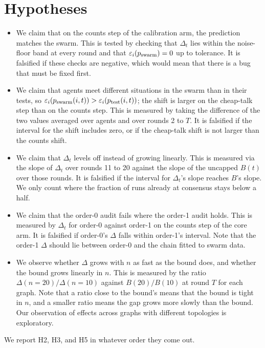 \section{Hypotheses}

\begin{itemize}
  \item[H1] We claim that on the counts step of the calibration arm, the prediction matches the swarm. This is tested by checking that $\Delta_t$ lies within the noise-floor band at every round and that $\varepsilon_i(p_{\mathrm{swarm}}) = 0$ up to tolerance. It is falsified if these checks are negative, which would mean that there is a bug that must be fixed first.
  \item[H2] We claim that agents meet different situations in the swarm than in their tests, so $\varepsilon_i(p_{\mathrm{swarm}}(i, t)) > \varepsilon_i(p_{\mathrm{test}}(i, t))$; the shift is larger on the cheap-talk step than on the counts step. This is measured by taking the difference of the two values averaged over agents and over rounds 2 to $T$. It is falsified if the interval for the shift includes zero, or if the cheap-talk shift is not larger than the counts shift.
  \item[H3] We claim that $\Delta_t$ levels off instead of growing linearly. This is measured via the slope of $\Delta_t$ over rounds 11 to 20 against the slope of the uncapped $B(t)$ over those rounds. It is falsified if the interval for $\Delta_t$'s slope reaches $B$'s slope. We only count where the fraction of runs already at consensus stays below a half.
  \item[H4] We claim that the order-0 audit fails where the order-1 audit holds. This is measured by $\Delta_t$ for order-0 against order-1 on the counts step of the core arm. It is falsified if order-0's $\Delta$ falls within order-1's interval. Note that the order-1 $\Delta$ should lie between order-0 and the chain fitted to swarm data.
  \item[H5] We observe whether $\Delta$ grows with $n$ as fast as the bound does, and whether the bound grows linearly in $n$. This is measured by the ratio $\Delta(n = 20) / \Delta(n = 10)$ against $B(20) / B(10)$ at round $T$ for each graph. Note that a ratio close to the bound's means that the bound is tight in $n$, and a smaller ratio means the gap grows more slowly than the bound. Our observation of effects across graphs with different topologies is exploratory.
\end{itemize}
We report H2, H3, and H5 in whatever order they come out.
